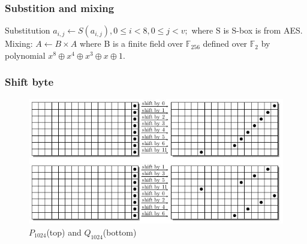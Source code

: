 \documentclass{beamer}
\begin{document}
\begin{frame}
\frametitle{Substition and mixing}
Substitution $a_{i,j} \gets S(a_{i,j}),  0 \leq i < 8, 0 \leq j < v;$ where S is S-box is from AES. \\
Mixing: $ A \gets B \times A$ where B is a finite field over $\mathbb{F}_{256}$ defined over 
$\mathbb{F}_{2}$ by polynomial $x^{8} \oplus x^{4} \oplus x^{3} \oplus x \oplus 1$.
\end{frame}

\begin{frame}
\frametitle{Shift byte}
\begin{figure}[h]
  \begin{center}
    \includegraphics[scale=0.37]{groestl1024shift.jpg}
  \end{center}
  \caption{$P_{1024}$(top) and $Q_{1024}$(bottom)\footnotemark}
  \label{fig:lab}
\end{figure}
\end{frame}

\end{document}

